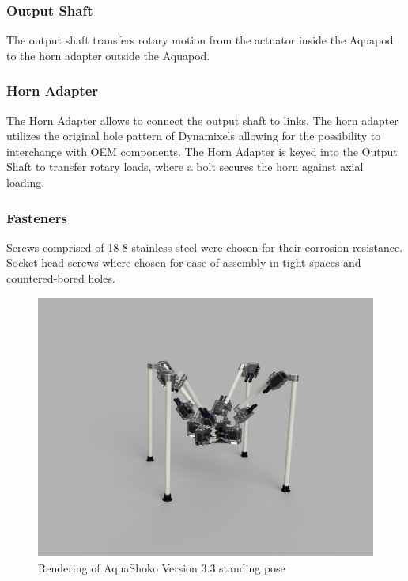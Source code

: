 \subsubsection{Output Shaft}
The output shaft transfers rotary motion from the actuator inside the Aquapod to the horn adapter outside the Aquapod.

\subsubsection{Horn Adapter}
The Horn Adapter allows to connect the output shaft to links. The horn adapter utilizes the original hole pattern of Dynamixels allowing for the possibility to interchange with OEM components.
The Horn Adapter is keyed into the Output Shaft to transfer rotary loads, where a bolt secures the horn against axial loading. 

\subsubsection{Fasteners}
Screws comprised of 18-8 stainless steel were chosen for their corrosion resistance. Socket head screws where chosen for ease of assembly in tight spaces and countered-bored holes.

\begin{figure}[h]
\centering
\includegraphics[width=1.0\columnwidth]{./img/aquaShoko-v3dot3-render-standPose.png}
\caption{Rendering of AquaShoko Version 3.3 standing pose}
\label{fig:shoko stand pose}
\end{figure}


